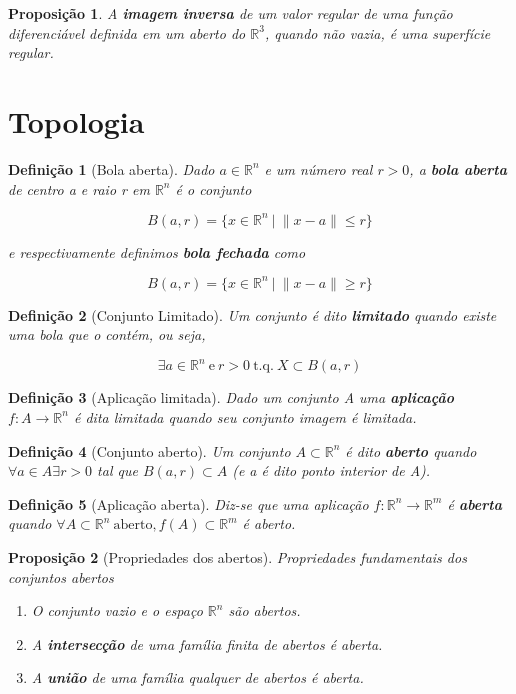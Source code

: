 \documentclass[12pt]{article}
\newtheorem{prop}{Proposição}
\newtheorem{definition}{Definição}
\begin{document}
\begin{prop}
A \textbf{imagem inversa} de um valor regular de uma função diferenciável definida em um aberto do $\mathbb{R}^3$, quando não vazia, é uma superfície regular.
\end{prop}


\section*{Topologia}\label{s3}
\begin{definition}[Bola aberta]
Dado $a \in \mathbb{R}^n$ e um número real $r > 0$, a \textbf{bola aberta} de centro a e raio r em $\mathbb{R}^n$ é o conjunto

$$B(a, r) = \{ x \in \mathbb{R}^n\ |\ \| x - a \| \leq r \}$$

e respectivamente definimos \textbf{bola fechada} como

$$B(a, r) = \{ x \in \mathbb{R}^n\ |\ \| x - a \| \geq r \}$$
\end{definition}

\begin{definition}[Conjunto Limitado]
Um conjunto é dito \textbf{limitado} quando existe uma bola que o contém, ou seja,

$$\exists a \in \mathbb{R}^n\ \mathrm{e}\ r>0\ \mathrm{t.q.}\ X \subset B(a, r)$$
\end{definition}

\begin{definition}[Aplicação limitada]
Dado um conjunto A uma \textbf{aplicação} $f: A \rightarrow \mathbb{R}^n$ é dita limitada quando seu conjunto imagem é limitada.
\end{definition}

\begin{definition}[Conjunto aberto]
Um conjunto $A \subset \mathbb{R}^n$ é dito \textbf{aberto} quando $\forall a \in A \exists r > 0$ tal que $B(a, r) \subset A$ (e a é dito ponto interior de A).
\end{definition}

\begin{definition}[Aplicação aberta]
Diz-se que uma aplicação $f: \mathbb{R}^n \rightarrow \mathbb{R}^m$ é \textbf{aberta} quando $\forall A \subset \mathbb{R}^n\ \mathrm{aberto}, f(A) \subset \mathbb{R}^m$ é aberto.
\end{definition}

\begin{prop}[Propriedades dos abertos]
Propriedades fundamentais dos conjuntos abertos

\begin{enumerate}
    \item O conjunto vazio e o espaço $\mathbb{R}^n$ são abertos.
    
    \item A \textbf{intersecção} de uma família finita de abertos é aberta.
    
    \item A \textbf{união} de uma família qualquer de abertos é aberta.
\end{enumerate}
\end{prop}
\end{document}
